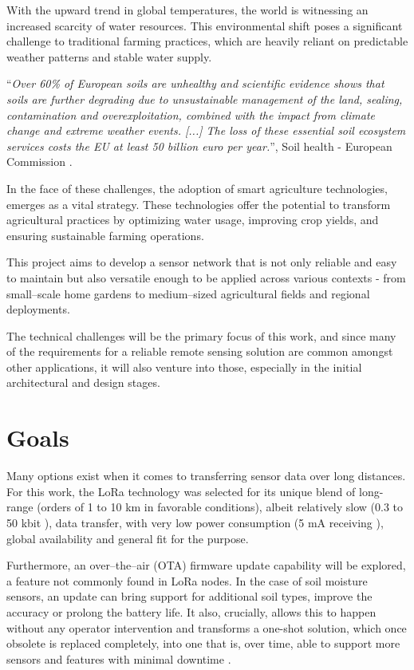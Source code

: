 
With the upward trend in global temperatures, the world is witnessing an increased scarcity of water resources. This environmental shift poses a significant challenge to traditional farming practices, which are heavily reliant on predictable weather patterns and stable water supply. 

``\emph{Over 60\% of European soils are unhealthy and scientific evidence shows that soils are further degrading due to unsustainable management of the land, sealing, contamination and overexploitation, combined with the impact from climate change and extreme weather events. [...] The loss of these essential soil ecosystem services costs the EU at least 50 billion euro per year.}'', Soil health - European Commission \cite{european_commission_soil_2024}.

In the face of these challenges, the adoption of smart agriculture technologies, emerges as a vital strategy. These technologies offer the potential to transform agricultural practices by optimizing water usage, improving crop yields, and ensuring sustainable farming operations.

This project aims to develop a sensor network that is not only reliable and easy to maintain but also versatile enough to be applied across various contexts - from small--scale home gardens to medium--sized agricultural fields and regional deployments. 

The technical challenges will be the primary focus of this work, and since many of the requirements for a reliable remote sensing solution are common amongst other applications, it will also venture into those, especially in the initial architectural and design stages. 

\section{Goals}
Many options exist when it comes to transferring sensor data over long distances. For this work, the LoRa technology was selected for its unique blend of long-range (orders of 1 to 10 km in favorable conditions), albeit relatively slow (0.3 to 50 kbit \cite{semtech_corporation_sx12612_2024}), data transfer, with very low power consumption (5 mA receiving \cite{semtech_corporation_sx12612_2024}), global availability and general fit for the purpose.

Furthermore, an over--the--air (OTA) firmware update capability will be explored, a feature not commonly found in LoRa nodes. In the case of soil moisture sensors, an update can bring support for additional soil types, improve the accuracy or prolong the battery life. It also, crucially, allows this to happen without any operator intervention and transforms a one-shot solution, which once obsolete is replaced completely, into one that is, over time, able to support more sensors and features with minimal downtime \cite{mobility_connected_what_2024,noauthor_android_2024,bucklin_brown_over--air_2024}.

